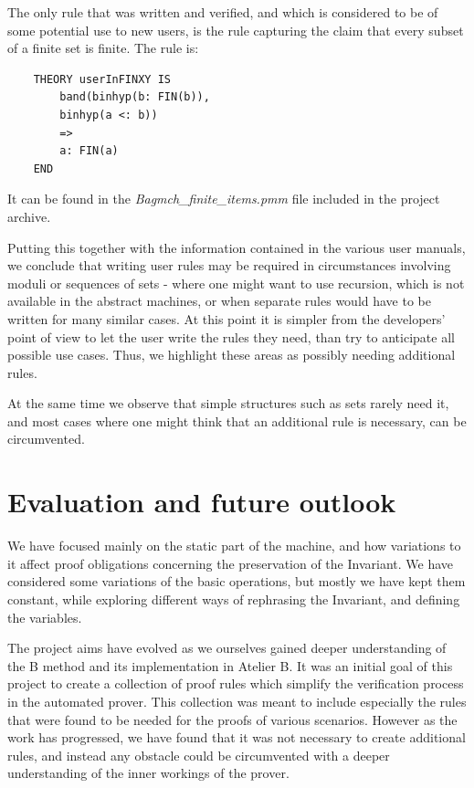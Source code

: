 \documentclass[12pt,journal,duplex]{IEEEtran}
\begin{document}
	The only rule that was written and verified, and which is considered to be of some potential use to new users, is the rule capturing the claim that every subset of a finite set is finite. The rule is:
	\begin{lstlisting}
	THEORY userInFINXY IS
		band(binhyp(b: FIN(b)),
		binhyp(a <: b))
		=>
		a: FIN(a)
	END
	\end{lstlisting}
	It can be found in the \emph{Bagmch\_finite\_items.pmm} file included in the project archive.

	Putting this together with the information contained in the various user manuals, we conclude that writing user rules may be required in circumstances involving moduli or sequences of sets - where one might want to use recursion, which is not available in the abstract machines, or when separate rules would have to be written for many similar cases. At this point it is simpler from the developers' point of view to let the user write the rules they need, than try to anticipate all possible use cases. Thus, we highlight these areas as possibly needing additional rules.

	At the same time we observe that simple structures such as sets rarely need it, and most cases where one might think that an additional rule is necessary, can be circumvented.


	\section{Evaluation and future outlook}
	We have focused mainly on the static part of the machine, and how variations to it affect proof obligations concerning the preservation of the Invariant. We have considered some variations of the basic operations, but mostly we have kept them constant, while exploring different ways of rephrasing the Invariant, and defining the variables.

	The project aims have evolved as we ourselves gained deeper understanding of the B method and its implementation in Atelier B. It was an initial goal of this project to create a collection of proof rules which simplify the verification process in the automated prover. This collection was meant to include especially the rules that were found to be needed for the proofs of various scenarios. However as the work has progressed, we have found that it was not necessary to create additional rules, and instead any obstacle could be circumvented with a deeper understanding of the inner workings of the prover.
\end{document}
